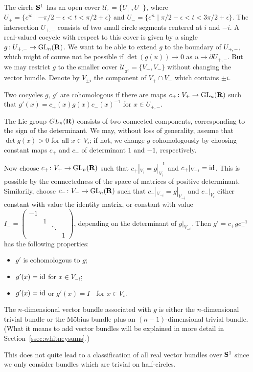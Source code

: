 \documentclass[a4paper,openany]{scrbook}
\begin{document}
\begin{example} \label{exa:bundlesons1}
The circle $\S^1$ has an open cover $\mathcal U_\epsilon = \{U_+,U_-\}$, where $U_+ = \{e^{it} \mid -\pi/2-\epsilon < t < \pi/2+\epsilon\}$ and $U_- = \{e^{it} \mid \pi/2-\epsilon < t < 3\pi/2+\epsilon\}$. The intersection $U_{+,-}$ consists of two small circle segments centered at $i$ and $-i$.  A real-valued cocycle with respect to this cover is given by a single $g\colon U_{+,-} \to \GL_n(\R)$. We want to be able to extend $g$ to the boundary of $U_{+,-}$, which might of course not be possible if $\det(g(u)) \to 0$ as $u \to \partial U_{+,-}$. But we may restrict $g$ to the smaller cover $\mathcal U_{\frac12\epsilon} = \{V_+,V_-\}$ without changing the vector bundle. 
Denote by $V_{\pm i}$ the component of $V_+ \cap V_-$ which contains $\pm i$.

Two cocycles $g$, $g'$ are cohomologous if there are maps $c_\pm\colon V_\pm \to \GL_n(\R)$ such that $g'(x)=c_+(x)g(x)c_-(x)^{-1}$ for $x \in U_{+,-}$.

The Lie group $GL_n(\R)$ consists of two connected components, corresponding to the sign of the determinant. We may, without loss of generality, assume that $\det g(x)>0$ for all $x \in V_i$; if not, we change $g$ cohomologously by choosing constant maps $c_+$ and $c_-$ of determinant $1$ and $-1$, respectively.

Now choose $c_+\colon V_+ \to \GL_n(\R)$ such that $c_+|_{V_i} = g|_{V_i}^{-1}$ and $c_+|_{V_{-i}} =  \id$. This is possible by the connectedness of the space of matrices of positive determinant. Similarily, choose $c_-\colon V_- \to \GL_n(\R)$ such that $c_-|_{V_{-i}} = g|_{V_{-i}}$ and $c_-|_{V_{i}}$ either constant with value the identity matrix, or constant with value $I_- = \begin{pmatrix}-1\\&1\\&& \ddots\\&&&1\end{pmatrix}$, depending on the determinant of $g|_{V_{-i}}$. Then $g' = c_+gc_-^{-1}$ has the following properties:
\begin{itemize}
\item $g'$ is cohomologous to $g$;
\item $g'(x) = \id$ for $x \in V_{-i}$;
\item $g'(x) = \id$ or $g'(x) = I_-$ for $x \in V_{i}$.
\end{itemize}
The $n$-dimensional vector bundle associated with $g$ is either the $n$-dimensional trivial bundle or the Möbius bundle plus an $(n-1)$-dimensional trivial bundle. (What it means to add vector bundles will be explained in more detail in Section~\ref{ssec:whitneysums}.)

This does not quite lead to a classification of all real vector bundles over $\S^1$ since we only consider bundles which are trivial on half-circles.
\end{example}
\end{document}
